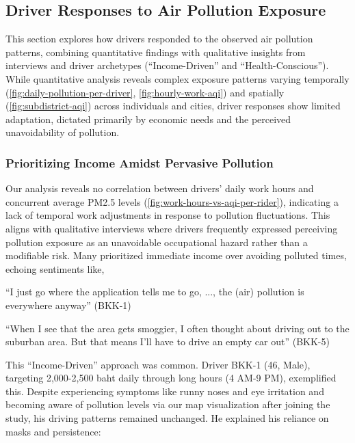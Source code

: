 \subsection{Driver Responses to Air Pollution Exposure}
This section explores how drivers responded to the observed air pollution patterns, combining quantitative findings with qualitative insights from interviews and driver archetypes (``Income-Driven'' and ``Health-Conscious'').
While quantitative analysis reveals complex exposure patterns varying temporally (\autoref{fig:daily-pollution-per-driver}, \autoref{fig:hourly-work-aqi}) and spatially (\autoref{fig:subdistrict-aqi}) across individuals and cities,
driver responses show limited adaptation, dictated primarily by economic needs and the perceived unavoidability of pollution.

\subsubsection{Prioritizing Income Amidst Pervasive Pollution}
Our analysis reveals no correlation between drivers' daily work hours and concurrent average PM2.5 levels (\autoref{fig:work-hours-vs-aqi-per-rider}), indicating a lack of temporal work adjustments in response to pollution fluctuations.
This aligns with qualitative interviews where drivers frequently expressed perceiving pollution exposure as an unavoidable occupational hazard rather than a modifiable risk.
Many prioritized immediate income over avoiding polluted times, echoing sentiments like,

\begin{quoteb}
    ``I just go where the application tells me to go, ..., the (air) pollution is everywhere anyway'' (BKK-1)
\end{quoteb}

\begin{quoteb}
    ``When I see that the area gets smoggier, I often thought about driving out to the suburban area. But that means I'll have to drive an empty car out'' (BKK-5)
\end{quoteb}

This ``Income-Driven'' approach was common.
Driver BKK-1 (46, Male), targeting 2,000-2,500 baht daily through long hours (4 AM-9 PM), exemplified this.
Despite experiencing symptoms like runny noses and eye irritation and becoming aware of pollution levels via our map visualization after joining the study, his driving patterns remained unchanged.
He explained his reliance on masks and persistence:

